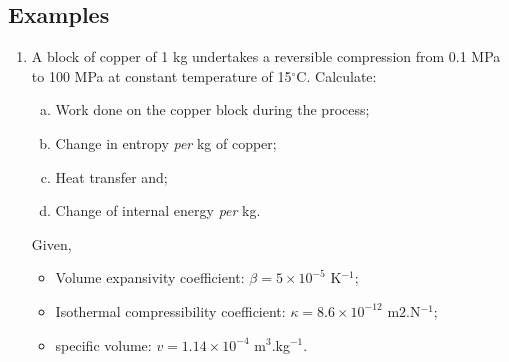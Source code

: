 \documentclass[12pts,a4paper,amsmath,amssymb,floatfix]{article}%
\begin{document}
\clearpage

\subsection{Examples}

\begin{enumerate}[1)]
\item\label{Mod03Ex01} A block of copper of 1 kg undertakes a reversible compression from 0.1 MPa to 100 MPa at constant temperature of 15$^{\circ}$C. Calculate:
    \begin{enumerate}[a)]
       \item Work done on the copper block during the process;
       \item Change in entropy {\it per} kg of copper;
       \item Heat transfer and;
       \item Change of internal energy {\it per} kg.
    \end{enumerate}
    Given, 
    \begin{itemize}
       \item Volume expansivity coefficient: $\beta = 5\times 10^{-5}$ K$^{-1}$;
       \item Isothermal compressibility coefficient: $\kappa = 8.6\times 10^{-12}$ m${2}$.N$^{-1}$;
       \item specific volume: $v=1.14\times 10^{-4}$ m$^{3}$.kg$^{-1}$.
    \end{itemize} 


\end{enumerate}
\end{document}

